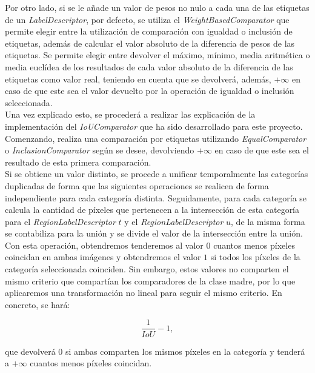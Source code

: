 Por otro lado, si se le añade un valor de pesos no nulo a cada una de las etiquetas de un \emph{LabelDescriptor}, por defecto, se utiliza el \emph{WeightBasedComparator} que permite elegir entre la utilización de comparación con igualdad o inclusión de etiquetas, además de calcular el valor absoluto de la diferencia de pesos de las etiquetas. Se permite elegir entre devolver el máximo, mínimo, media aritmética o media euclídea de los resultados de cada valor absoluto de la diferencia de las etiquetas como valor real, teniendo en cuenta que se devolverá, además, $+\infty$ en caso de que este sea el valor devuelto por la operación de igualdad o inclusión seleccionada.\\

Una vez explicado esto, se procederá a realizar las explicación de la implementación del \emph{IoUComparator} que ha sido desarrollado para este proyecto.\\

Comenzando, realiza una comparación por etiquetas utilizando \emph{EqualComparator} o \emph{InclusionComparator} según se desee, devolviendo $+\infty$ en caso de que este sea el resultado de esta primera comparación.\\

Si se obtiene un valor distinto, se procede a unificar temporalmente las categorías duplicadas de forma que las siguientes operaciones se realicen de forma independiente para cada categoría distinta. Seguidamente, para cada categoría se calcula la cantidad de píxeles que pertenecen a la intersección de esta categoría para el \emph{RegionLabelDescriptor} $t$ y el \emph{RegionLabelDescriptor} $u$, de la misma forma se contabiliza para la unión y se divide el valor de la intersección entre la unión.\\

Con esta operación, obtendremos tenderemos al valor $0$ cuantos menos píxeles coincidan en ambas imágenes y obtendremos el valor $1$ si todos los píxeles de la categoría seleccionada coinciden. Sin embargo, estos valores no comparten el mismo criterio que compartían los comparadores de la clase madre, por lo que aplicaremos una transformación no lineal para seguir el mismo criterio. En concreto, se hará:

$$\frac{1}{IoU}-1,$$

que devolverá $0$ si ambas comparten los mismos píxeles en la categoría y tenderá a $+\infty$ cuantos menos píxeles coincidan.\\

